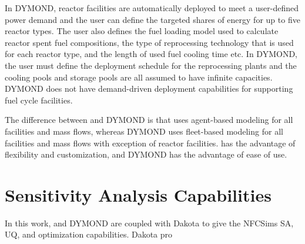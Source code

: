 In DYMOND, reactor facilities are automatically deployed to 
meet a user-defined power demand and the user can define 
the targeted shares of energy for up to five reactor types. 
The user also defines the fuel loading model used to calculate 
reactor spent fuel compositions, the type of reprocessing 
technology that is used for each reactor type, and the length 
of used fuel cooling time etc. 
In DYMOND, the user must define the deployment schedule for 
the reprocessing plants and the cooling pools and storage pools 
are all assumed to have infinite capacities. 
DYMOND does not have demand-driven deployment capabilities for 
supporting fuel cycle facilities. 

The difference between \Cyclus and DYMOND is that \Cyclus uses 
agent-based modeling for all facilities and mass flows, 
whereas DYMOND uses fleet-based modeling for all facilities and 
mass flows with exception of reactor facilities. 
\Cyclus has the advantage of flexibility and customization, 
and DYMOND has the advantage of ease of use. 

\section{Sensitivity Analysis Capabilities}
In this work, \Cyclus and DYMOND are coupled with Dakota 
\cite{eldred_dakota_2010} to give the \glspl{NFCSim} \gls{SA}, 
\gls{UQ}, and optimization capabilities. 
Dakota pro